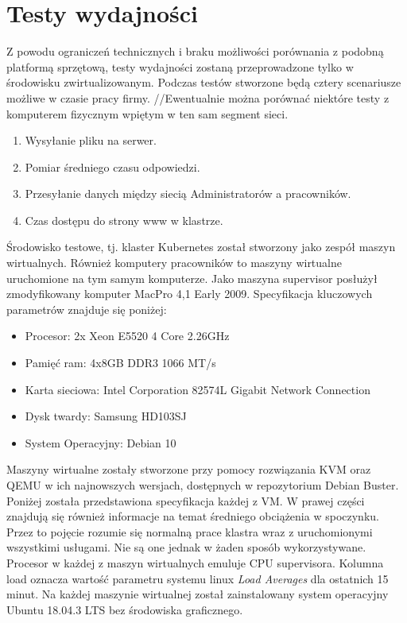 \documentclass[pl,final,oneside]{mgr} %
\begin{document}
\section{Testy wydajności}
Z powodu ograniczeń technicznych i braku możliwości porównania z podobną platformą sprzętową, testy wydajności zostaną przeprowadzone tylko w środowisku zwirtualizowanym. Podczas testów stworzone będą cztery scenariusze możliwe w czasie pracy firmy.
//Ewentualnie można porównać niektóre testy z komputerem fizycznym wpiętym w ten sam segment sieci.
\begin{enumerate}
	\item Wysyłanie pliku na serwer.
	\item Pomiar średniego czasu odpowiedzi.
	\item Przesyłanie danych między siecią Administratorów a pracowników.
	\item Czas dostępu do strony www w klastrze.
\end{enumerate}
Środowisko testowe, tj. klaster Kubernetes został stworzony jako zespół maszyn wirtualnych. Również komputery pracowników to maszyny wirtualne uruchomione na tym samym komputerze. Jako maszyna supervisor posłużył zmodyfikowany komputer MacPro 4,1 Early 2009. Specyfikacja kluczowych parametrów znajduje się poniżej:
\begin{itemize}
	\item Procesor: 2x Xeon E5520 4 Core 2.26GHz
	\item Pamięć ram: 4x8GB DDR3 1066 MT/s
	\item Karta sieciowa: Intel Corporation 82574L Gigabit Network Connection
	\item Dysk twardy: Samsung HD103SJ 
	\item System Operacyjny: Debian 10	
\end{itemize}

Maszyny wirtualne zostały stworzone przy pomocy rozwiązania KVM oraz QEMU w ich najnowszych wersjach, dostępnych w repozytorium Debian Buster. Poniżej została przedstawiona specyfikacja każdej z VM. W prawej części znajdują się również informacje na temat średniego obciążenia w spoczynku. Przez to pojęcie rozumie się normalną prace klastra wraz z uruchomionymi wszystkimi usługami. Nie są one jednak w żaden sposób wykorzystywane. Procesor w każdej z maszyn wirtualnych emuluje CPU supervisora. Kolumna load oznacza wartość parametru systemu linux \textit{Load Averages} dla ostatnich 15 minut. Na każdej maszynie wirtualnej został zainstalowany system operacyjny Ubuntu 18.04.3 LTS bez środowiska graficznego.
\end{document}
